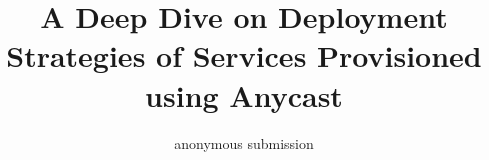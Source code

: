 \documentclass[10pt, conference, letterpaper]{IEEEtran}
\begin{document}
\title{A Deep Dive on Deployment Strategies of Services Provisioned using Anycast}

\author{anonymous submission}

\maketitle


\glsresetall %





%
%

%





\end{document}
